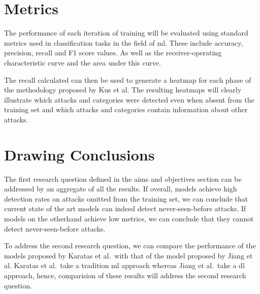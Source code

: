 \section{Metrics}%
\label{sec:metrics}

The performance of each iteration of training will be evaluated using standard
metrics used in classification tasks in the field of \gls{ml}. These include
accuracy, precision, recall and F1 score values. As well as the
receiver-operating characteristic curve and the area under this curve.

The recall calculated can then be used to generate a heatmap for each phase of
the methodology proposed by Kus et al. The resulting heatmaps will clearly
illustrate which attacks and categories were detected even when absent from the
training set and which attacks and categories contain information about other
attacks.

\section{Drawing Conclusions}%
\label{sec:conclusions}

The first research question defined in the aims and objectives section can be
addressed by an aggregate of all the results. If overall, models achieve high
detection rates on attacks omitted from the training set, we can conclude that
current state of the art models can indeed detect never-seen-before attacks. If
models on the otherhand achieve low metrics, we can conclude that they cannot
detect never-seen-before attacks.

To address the second research question, we can compare the performance of the
models proposed by Karatas et al.\ with that of the model proposed by Jiang et
al. Karatas et al.\ take a tradition \gls{ml} approach whereas Jiang et al.\
take a \gls{dl} approach, hence, comparision of these results will address the
second research question.